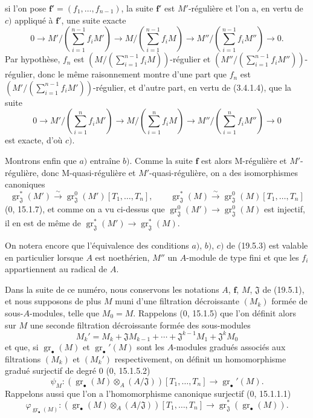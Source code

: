 
si l'on pose $\mathbf f'=(f_1,\ldots,f_{n-1})$, la suite $\mathbf f'$ est $M'$-régulière et l'on a, en vertu de $c)$ appliqué à $\mathbf f'$, une suite exacte
\[
  0\longrightarrow M'/(\textstyle\sum_{i=1}^{n-1}f_iM')\longrightarrow M/(\textstyle\sum_{i=1}^{n-1}f_iM)\longrightarrow M''/(\textstyle\sum_{i=1}^{n-1}f_iM'')\longrightarrow0.
\]
Par hypothèse, $f_n$ est $(M/(\sum_{i=1}^{n-1}f_iM))$-régulier et $(M''/(\sum_{i=1}^{n-1}f_iM''))$-régulier, donc le même raisonnement montre d'une part que $f_n$ est $(M'/(\sum_{i=1}^{n-1}f_iM'))$-régulier, et d'autre part, en vertu de (3.4.1.4), que la suite
\[
  0\longrightarrow M'/(\textstyle\sum_{i=1}^{n}f_iM')\longrightarrow M/(\textstyle\sum_{i=1}^{n}f_iM)\longrightarrow M''/(\textstyle\sum_{i=1}^{n}f_iM'')\longrightarrow0
\]
est exacte, d'où $c)$.

Montrons enfin que $a)$ entraîne $b)$. Comme la suite $\mathbf f$ est alors M-régulière et $M'$-régulière, donc M-quasi-régulière et $M'$-quasi-régulière, on a des isomorphismes canoniques
\[
  \operatorname{gr}_{\mathfrak J}^*(M')\xrightarrow{\sim}\operatorname{gr}_{\mathfrak J}^0(M')[T_1,\ldots,T_n],
  \qquad
  \operatorname{gr}_{\mathfrak J}^*(M)\xrightarrow{\sim}\operatorname{gr}_{\mathfrak J}^0(M)[T_1,\ldots,T_n]
\]
($0$, 15.1.7), et comme on a vu ci-dessus que $\operatorname{gr}_{\mathfrak J}^0(M')\to\operatorname{gr}_{\mathfrak J}^0(M)$ est injectif, il en est de même de $\operatorname{gr}_{\mathfrak J}^*(M')\to\operatorname{gr}_{\mathfrak J}^*(M)$.

On notera encore que l'équivalence des conditions $a)$, $b)$, $c)$ de (19.5.3) est valable en particulier lorsque $A$ est noethérien, $M''$ un $A$-module de type fini et que les $f_i$ appartiennent au radical de $A$.

\begin{env}[19.5.4]
\label{IV.19.5.4}
Dans la suite de ce numéro, nous conservons les notations $A$, $\mathbf f$, $M$, $\mathfrak J$ de (19.5.1), et nous supposons de plus $M$ muni d'une filtration décroissante $(M_k)$ formée de sous-$A$-modules, telle que $M_0=M$. Rappelons ($0$, 15.1.5) que l'on définit alors sur $M$ une seconde filtration décroissante formée des sous-modules
\[
  M_k'=M_k+\mathfrak JM_{k-1}+\cdots+\mathfrak J^{k-1}M_1+\mathfrak J^kM_0
\]
et que, si $\operatorname{gr}_\bullet(M)$ et $\operatorname{gr}_\bullet'(M)$ sont les $A$-modules gradués associés aux filtrations $(M_k)$ et $(M_k')$ respectivement, on définit un homomorphisme gradué surjectif de degré $0$ ($0$, 15.1.5.2)
\[
  \psi_M:(\operatorname{gr}_\bullet(M)\otimes_A(A/\mathfrak J))[T_1,\ldots,T_n]\longrightarrow\operatorname{gr}_\bullet'(M).
\]
Rappelons aussi que l'on a l'homomorphisme canonique surjectif ($0$, 15.1.1.1)
\[
  \varphi_{\operatorname{gr}_\bullet(M)}:(\operatorname{gr}_\bullet(M)\otimes_A(A/\mathfrak J))[T_1,\ldots,T_n]\longrightarrow\operatorname{gr}_{\mathfrak J}^*(\operatorname{gr}_\bullet(M)).
\]
\end{env}

